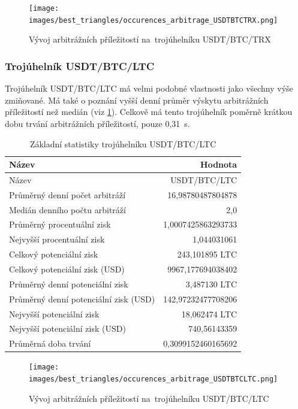 \documentclass[thesis=B,czech]{FITthesis}[2019/03/21]
\begin{document}
\begin{figure}\centering
	\texttt{[image: images/best\_triangles/occurences\_arbitrage\_USDTBTCTRX.png]}
	\caption{Vývoj arbitrážních příležitostí na~trojúhelníku USDT/BTC/TRX }\label{occurences_arbitrage_USDTBTCTRX}
\end{figure}



\subsubsection{Trojúhelník USDT/BTC/LTC}
Trojúhelník USDT/BTC/LTC má velmi podobné vlastnosti jako všechny výše zmiňované. Má také o poznání vyšší denní průměr výskytu arbitrážních \linebreak příležitostí než medián (viz \ref{USDTBTCLTC_stats}). Celkově má tento trojúhelník poměrně krátkou dobu trvání arbitrážních příležitostí, pouze 0,31~s. 

\begin{table}\centering
\caption{Základní statistiky trojúhelníku USDT/BTC/LTC}
\label{USDTBTCLTC_stats}
\begin{tabular}{|| l | r ||}
\hline Název & Hodnota \\ 
\hline\hline Název & USDT/BTC/LTC \\ 
\hline Průměrný denní počet arbitráží & 16,98780487804878 \\ 
\hline Medián denního počtu arbitráží & 2,0 \\ 
\hline Průměrný procentuální zisk & 1,0007425863293733 \\ 
\hline Nejvyšší procentuální zisk & 1,044031061 \\ 
\hline Celkový potenciální zisk & 243,101895 LTC \\ 
\hline Celkový potenciální zisk (USD) & 9967,177694038402 \\ 
\hline Průměrný denní potenciální zisk & 3,487130 LTC \\ 
\hline Průměrný denní potenciální zisk (USD) & 142,97232477708206 \\ 
\hline Nejvyšší potenciální zisk & 18,062474 LTC \\ 
\hline Nejvyšší potenciální zisk (USD) & 740,56143359 \\ 
\hline Průměrná doba trvání & 0,3099152460165692 \\ 
\hline
\end{tabular}
\end{table}

\begin{figure}\centering
	\texttt{[image: images/best\_triangles/occurences\_arbitrage\_USDTBTCLTC.png]}
	\caption{Vývoj arbitrážních příležitostí na~trojúhelníku USDT/BTC/LTC }\label{occurences_arbitrage_USDTBTCLTC}
\end{figure}
\end{document}
